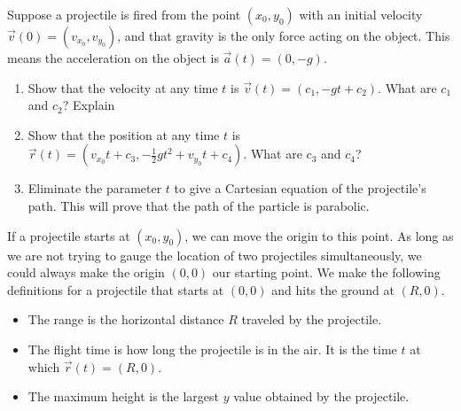 \begin{problem}%
Suppose a projectile is fired from the point $(x_0,y_0)$ with an initial velocity $\vec v(0)=(v_{x_0},v_{y_0})$, and that gravity is the only force acting on the object. This means the acceleration on the object is $\vec a(t) = (0,-g)$.
\begin{enumerate}
 \item Show that the velocity at any time $t$ is $\vec v(t) = (c_1,-gt+c_2)$. What are $c_1$ and $c_2$? Explain
 \item Show that the position at any time $t$ is $\vec r(t) = (v_{x_0}t+c_3, -\frac{1}{2}gt^2+v_{y_0}t+c_4)$. What are $c_3$ and $c_4$? 
 \item Eliminate the parameter $t$ to give a Cartesian equation of the projectile's path. This will prove that the path of the particle is parabolic.
\end{enumerate}
\end{problem}

If a projectile starts at $(x_0,y_0)$, we can move the origin to this point. As long as we are not trying to gauge the location of two projectiles simultaneously, we could always make the origin $(0,0)$ our starting point.   
We make the following definitions for a projectile that starts at $(0,0)$ and hits the ground at $(R,0)$.
\begin{itemize}
 \item The range is the horizontal distance $R$ traveled by the projectile.  
 \item The flight time is how long the projectile is in the air. It is the time $t$ at which $\vec r(t)=(R,0)$.
 \item The maximum height is the largest $y$ value obtained by the projectile. 
\end{itemize}



